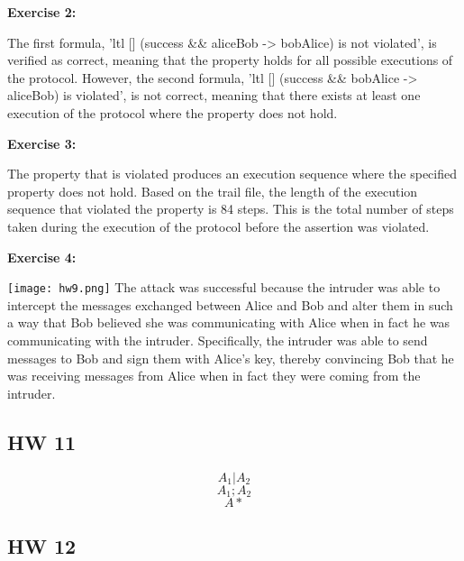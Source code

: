 \documentclass{article}
\theoremstyle{theorem}
\theoremstyle{definition}
\theoremstyle{remark}
\begin{document}
{\bf Exercise 2:}

The first formula, 'ltl {[] (success \&\& aliceBob -> bobAlice)} is not violated', is verified as correct, meaning that the property holds for all possible executions of the protocol. However, the second formula, 'ltl {[] (success \&\& bobAlice -> aliceBob)} is violated', is not correct, meaning that there exists at least one execution of the protocol where the property does not hold.


{\bf Exercise 3:}

The property that is violated produces an execution sequence where the specified property does not hold. Based on the trail file, the length of the execution sequence that violated the property is 84 steps. This is the total number of steps taken during the execution of the protocol before the assertion was violated.

{\bf Exercise 4:}

\texttt{[image: hw9.png]}
The attack was successful because the intruder was able to intercept the messages exchanged between Alice and Bob and alter them in such a way that Bob believed she was communicating with Alice when in fact he was communicating with the intruder. Specifically, the intruder was able to send messages to Bob and sign them with Alice's key, thereby convincing Bob that he was receiving messages from Alice when in fact they were coming from the intruder.

\subsection{HW 11}

\[A_1|A_2\]
\[A_1;A_2\]
\[A*\]

\subsection{HW 12}
\end{document}

